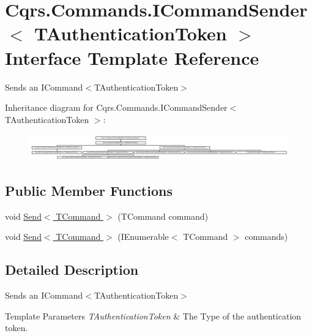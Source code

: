\hypertarget{interfaceCqrs_1_1Commands_1_1ICommandSender}{}\section{Cqrs.\+Commands.\+I\+Command\+Sender$<$ T\+Authentication\+Token $>$ Interface Template Reference}
\label{interfaceCqrs_1_1Commands_1_1ICommandSender}


Sends an I\+Command$<$\+T\+Authentication\+Token$>$  


Inheritance diagram for Cqrs.\+Commands.\+I\+Command\+Sender$<$ T\+Authentication\+Token $>$\+:\begin{figure}[H]
\begin{center}
\leavevmode
\includegraphics[height=1.159420cm]{interfaceCqrs_1_1Commands_1_1ICommandSender}
\end{center}
\end{figure}
\subsection*{Public Member Functions}
\begin{DoxyCompactItemize}
\item 
void \hyperlink{interfaceCqrs_1_1Commands_1_1ICommandSender_a551d69f8679399fc0ce0fd99dead507a_a551d69f8679399fc0ce0fd99dead507a}{Send$<$ T\+Command $>$} (T\+Command command)
\item 
void \hyperlink{interfaceCqrs_1_1Commands_1_1ICommandSender_a3fb3ec40a3e862f721a7c9204e67e832_a3fb3ec40a3e862f721a7c9204e67e832}{Send$<$ T\+Command $>$} (I\+Enumerable$<$ T\+Command $>$ commands)
\end{DoxyCompactItemize}


\subsection{Detailed Description}
Sends an I\+Command$<$\+T\+Authentication\+Token$>$ 


\begin{DoxyTemplParams}{Template Parameters}
{\em T\+Authentication\+Token} & The Type of the authentication token.\\
\hline
\end{DoxyTemplParams}


